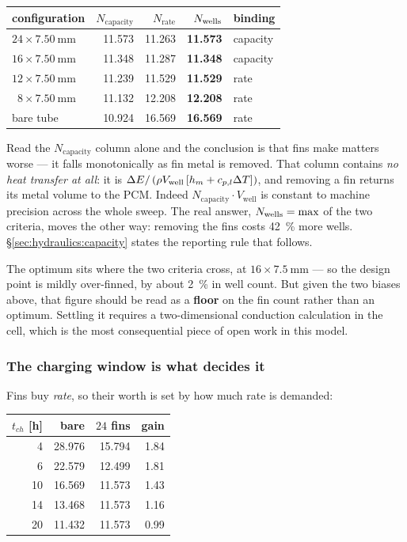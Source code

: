 \begin{center}
\begin{tabular}{@{}l r r r l@{}}
\toprule
configuration & $N_{\mathrm{capacity}}$ & $N_{\mathrm{rate}}$
              & $N_{\mathrm{wells}}$ & binding \\
\midrule
$24\times\SI{7.50}{\milli\meter}$ & 11.573 & 11.263 & \textbf{11.573} & capacity \\
$16\times\SI{7.50}{\milli\meter}$ & 11.348 & 11.287 & \textbf{11.348} & capacity \\
$12\times\SI{7.50}{\milli\meter}$ & 11.239 & 11.529 & \textbf{11.529} & rate \\
$\phantom{0}8\times\SI{7.50}{\milli\meter}$ & 11.132 & 12.208 & \textbf{12.208} & rate \\
bare tube & 10.924 & 16.569 & \textbf{16.569} & rate \\
\bottomrule
\end{tabular}
\end{center}

\noindent
Read the $N_{\mathrm{capacity}}$ column alone and the conclusion is that fins
make matters worse --- it falls monotonically as fin metal is removed. That
column contains \emph{no heat transfer at all}: it is
$\Delta E/\left(\rho V_{\mathrm{well}}\left[h_{m}+c_{p,l}\Delta T\right]\right)$,
and removing a fin returns its metal volume to the PCM. Indeed
$N_{\mathrm{capacity}}\cdot V_{\mathrm{well}}$ is constant to machine precision
across the whole sweep. The real answer, $N_{\mathrm{wells}}=\max$ of the two criteria,
moves the other way: removing the fins costs \SI{42}{\percent} more wells.
\S\ref{sec:hydraulics:capacity} states the reporting rule that follows.

The optimum sits where the two criteria cross, at $16\times\SI{7.5}{\milli\meter}$
--- so the design point is mildly over-finned, by about \SI{2}{\percent} in well
count. But given the two biases above, that figure should be read as a
\textbf{floor} on the fin count rather than an optimum. Settling it requires a
two-dimensional conduction calculation in the cell, which is the most
consequential piece of open work in this model.

\subsubsection*{The charging window is what decides it}

Fins buy \emph{rate}, so their worth is set by how much rate is demanded:

\begin{center}
\begin{tabular}{@{}r r r r@{}}
\toprule
$t_{ch}$ [h] & bare & $24$ fins & gain \\
\midrule
 4 & 28.976 & 15.794 & 1.84 \\
 6 & 22.579 & 12.499 & 1.81 \\
10 & 16.569 & 11.573 & 1.43 \\
14 & 13.468 & 11.573 & 1.16 \\
20 & 11.432 & 11.573 & 0.99 \\
\bottomrule
\end{tabular}
\end{center}

